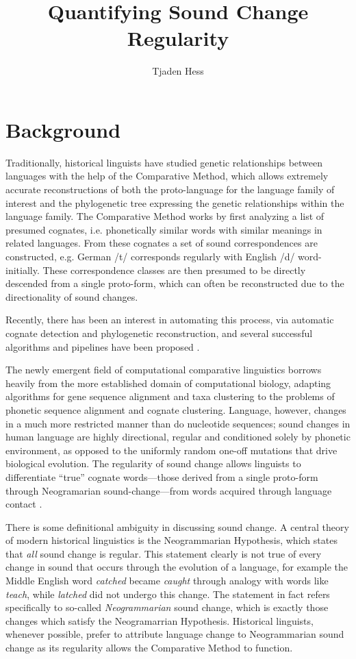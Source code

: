 \documentclass[doc,natbib,11pt]{apa6}
\title{Quantifying Sound Change Regularity}
\author{Tjaden Hess}
\affiliation{Linguistics 4424\\Cornell University}
\begin{document}
\maketitle
\doublespacing
\section{ Background }
Traditionally, historical linguists have studied genetic relationships between languages with the help of the Comparative Method, which allows extremely accurate reconstructions of both the proto-language for the language family of interest and the phylogenetic tree expressing the genetic relationships within the language family. The Comparative Method works by first analyzing a list of presumed cognates, i.e. phonetically similar words with similar meanings in related languages. From these cognates a set of sound correspondences are constructed, e.g. German /t/ corresponds regularly with English /d/ word-initially.  These correspondence classes are then presumed to be directly descended from a single proto-form, which can often be reconstructed due to the directionality of sound changes. 

Recently, there has been an interest in automating this process, via automatic cognate detection and phylogenetic reconstruction, and several successful algorithms and pipelines have been proposed \citep{List2017a}.

The newly emergent field of computational comparative linguistics borrows heavily from the more established domain of computational biology, adapting algorithms for gene sequence alignment and taxa clustering to the problems of phonetic sequence alignment and cognate clustering. Language, however, changes in a much more restricted manner than do nucleotide sequences; sound changes in human language are highly directional, regular and conditioned solely by phonetic environment, as opposed to the uniformly random one-off mutations that drive biological evolution. The regularity of sound change allows linguists to differentiate ``true'' cognate words---those derived from a single proto-form through Neogramarian sound-change---from words acquired through language contact \citep[p. 108]{Campbell1999}.

There is some definitional ambiguity in discussing sound change. A central theory of modern historical linguistics is the Neogrammarian Hypothesis, which states that \emph{all} sound change is regular. This statement clearly is not true of every change in sound that occurs through the evolution of a language, for example the Middle English word \emph{catched} became \emph{caught} through analogy with words like \emph{teach}, while \emph{latched} did not undergo this change. The statement in fact refers specifically to so-called \emph{Neogrammarian} sound change, which is exactly those changes which satisfy the Neogramarrian Hypothesis. Historical linguists, whenever possible, prefer to attribute language change to Neogrammarian sound change as its regularity allows the Comparative Method to function. 
\end{document}
